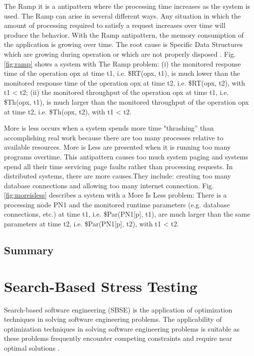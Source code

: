 \documentclass{report}
\begin{document}
The Ramp it is a antipattern where the processing time increases as the system is used. The Ramp can arise in several different ways. Any situation in which the amount of processing required to satisfy a request increases over time will produce the behavior. With the Ramp antipattern, the memory consumption of the application is growing over time. The root cause is Specific Data Structures which are growing during operation or which are not properly disposed \cite{Wert2014} \cite{Smith2003}. Fig. \ref{fig:ramp} shows a system  with The Ramp problem:  (i) the monitored response time of the operation opx at time t1, i.e. \$RT(opx, t1), is much lower than the monitored response time of the operation opx at time t2, i.e. \$RT(opx, t2), with t1 < t2; (ii) the monitored throughput of the operation opx at time t1, i.e. \$Th(opx, t1), is much larger than the monitored throughput of the operation opx at time t2, i.e. \$Th(opx, t2), with t1 < t2.

More is less occurs when a system spends more time "thrashing” than accomplishing real work because there are too many processes relative to available resources. More is Less are presented when it is running too many programs overtime. This antipattern causes too much system paging and systems spend all their time servicing page faults rather than processing requests. In distributed systems, there are more causes.They include: creating too many database connections and  allowing too many internet connection. Fig. \ref{fig:moreisless} describes a system  with a More Is Less problem: There is a processing node PN1 and the monitored runtime parameters (e.g. database connections, etc.) at time t1, i.e. \$Par(PN1[p], t1), are much larger than the same parameters at time t2, i.e. \$Par(PN1[p], t2), with t1 < t2.

\section{Summary}

\chapter{Search-Based Stress Testing}

Search-based software engineering (SBSE) is the application of optimization techniques in solving software engineering problems. The applicability of optimization techniques in solving software engineering problems is suitable as these problems frequently encounter competing constraints and require near optimal solutions \cite{Afzal2009a} \cite{Harman2015}.
\end{document}
